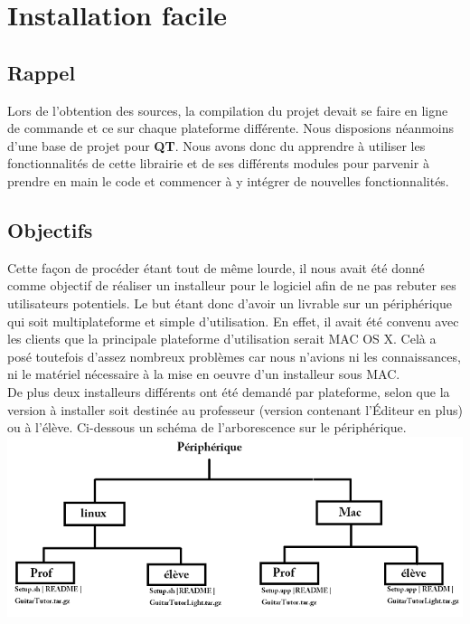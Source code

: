 \documentclass[a4paper,10pt]{article}
\title{}
\author{}
\begin{document}
\maketitle

\begin{abstract}

\end{abstract}

\section{Installation facile}
\subsection{Rappel}
Lors de l'obtention des sources, la compilation du projet devait se faire en ligne de commande
et ce sur chaque plateforme différente. Nous disposions néanmoins d'une base de projet pour 
\textbf{QT}. Nous avons donc du apprendre à utiliser les fonctionnalités de cette librairie
et de ses différents modules pour parvenir à prendre en main le code et commencer à y
intégrer de nouvelles fonctionnalités.

\subsection{Objectifs}
Cette façon de procéder étant tout de même lourde, il nous avait été donné comme objectif de réaliser
un installeur pour le logiciel afin de ne pas rebuter ses utilisateurs potentiels. Le but étant donc
d'avoir un livrable sur un périphérique qui soit multiplateforme et simple d'utilisation.
En effet, il avait été convenu avec les clients que la principale plateforme d'utilisation serait
MAC OS X. Celà a posé toutefois d'assez nombreux problèmes car nous n'avions ni les connaissances,
ni le matériel nécessaire à la mise en oeuvre d'un installeur sous MAC.
\\
De plus deux installeurs différents ont été demandé par plateforme, selon que la version à installer
soit destinée au professeur (version contenant l'Éditeur en plus) ou à l'élève. Ci-dessous un schéma
de l'arborescence sur le périphérique.
\includegraphics[scale=0.6]{arborescence_installation.png}
\end{document}
